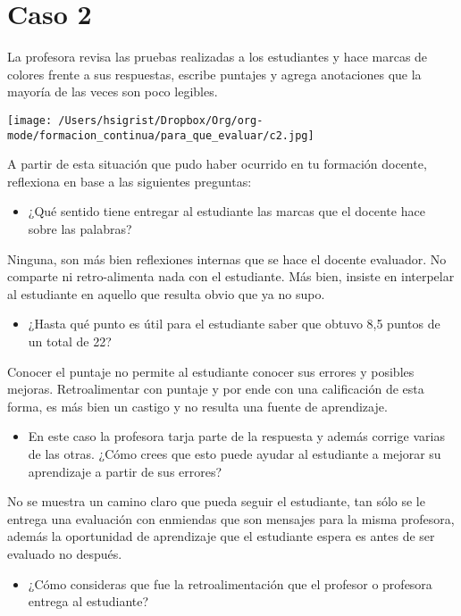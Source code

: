 \documentclass[12pt,letterpaper,article,x11names]{memoir}
\begin{document}
\section{Caso 2}
\label{sec:orgbaa5c6d}
La profesora revisa las pruebas realizadas a los estudiantes y hace marcas de colores frente a sus respuestas, escribe puntajes y agrega anotaciones que la mayoría de las veces son poco legibles.

\begin{center}
\texttt{[image: /Users/hsigrist/Dropbox/Org/org-mode/formacion\_continua/para\_que\_evaluar/c2.jpg]}
\end{center}

A partir de esta situación que pudo haber ocurrido en tu formación docente, reflexiona en base a las siguientes preguntas:
\begin{itemize}
\item ¿Qué sentido tiene entregar al estudiante las marcas que el docente hace sobre las palabras?
\end{itemize}
Ninguna, son más bien reflexiones internas que se hace el docente evaluador. No comparte ni retro-alimenta nada con el estudiante. Más bien, insiste en interpelar al estudiante en aquello que resulta obvio que ya no supo. 
\begin{itemize}
\item ¿Hasta qué punto es útil para el estudiante saber que obtuvo 8,5 puntos de un total de 22?
\end{itemize}
Conocer el puntaje no permite al estudiante conocer sus errores y posibles mejoras. Retroalimentar con puntaje y por ende con una calificación de esta forma, es más bien un castigo y no resulta una fuente de aprendizaje.
\begin{itemize}
\item En este caso la profesora tarja parte de la respuesta y además corrige varias de las otras. ¿Cómo crees que esto puede ayudar al estudiante a mejorar su aprendizaje a partir de sus errores?
\end{itemize}
No se muestra un camino claro que pueda seguir el estudiante, tan sólo se le entrega una evaluación con enmiendas que son mensajes para la misma profesora, además la oportunidad de aprendizaje que el estudiante espera es antes de ser evaluado no después.
\begin{itemize}
\item ¿Cómo consideras que fue la retroalimentación que el profesor o profesora entrega al estudiante?
\end{itemize}
\end{document}
